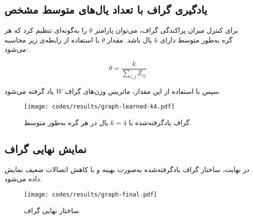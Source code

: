 \documentclass[10pt,twocolumn,a4paper]{article}
\begin{document}
	\subsection{یادگیری گراف با تعداد یال‌های متوسط مشخص}
	برای کنترل میزان پراکندگی گراف، می‌توان پارامتر \( \theta \) را به‌گونه‌ای تنظیم کرد که هر گره به‌طور متوسط دارای \( k \) یال باشد. مقدار \( \theta \) با استفاده از رابطه‌ی زیر محاسبه می‌شود:
	
	\[
	\theta = \frac{k}{\sum_{i,j} Z_{ij}}
	\]
	
	سپس با استفاده از این مقدار، ماتریس وزن‌های گراف \( W \) یاد گرفته می‌شود.
	
	\begin{latin}
		
	\end{latin}
	
	
	\begin{figure}[H]
		\centering
		\texttt{[image: codes/results/graph-learned-k4.pdf]}
		\caption{گراف یادگرفته‌شده با \( k = 4 \) یال در هر گره به‌طور متوسط.}
		\label{fig:graph-learned-k4}
	\end{figure}
	
	\subsection{نمایش نهایی گراف}
	در نهایت، ساختار گراف یادگرفته‌شده به‌صورت بهینه و با کاهش اتصالات ضعیف نمایش داده می‌شود.
	
	\begin{latin}
		
	\end{latin}
	
	
	\begin{figure}[H]
		\centering
		\texttt{[image: codes/results/graph-final.pdf]}
		\caption{ساختار نهایی گراف.}
		\label{fig:graph-final}
	\end{figure}
	
    	

    
  
\end{document}
